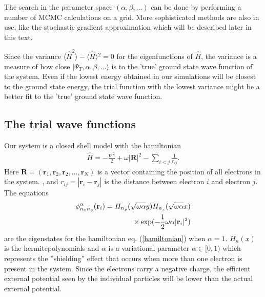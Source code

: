 \documentclass[a4paper,10pt,twocolumn]{article} %
\newcommand{\ts}[1]{\textbf{#1}}
\newcommand{\ket}[1]{|#1\rangle{}}
\newcommand{\expec}[1]{\langle{}{#1}\rangle{}}
\begin{document}
The search in the parameter space $(\alpha,\beta, \dots)$ can be done by performing a number of MCMC calculations on a grid. 
More sophisticated methods are also in use, like the stochastic gradient approximation which will be described later in this text.

Since the variance $\expec{\hat H^2}-\expec{\hat H}^2=0$ for the eigenfunctions of $\hat H$, the variance is a measure of how close 
$\ket{\Psi_T,\alpha,\beta,\dots}$ is to the 'true' ground state wave function of the system. Even if the lowest energy obtained in our simulations will be closest 
to the ground state energy, the trial function with the lowest variance might be a better fit to the 'true' ground state wave function. 

\subsection{The trial wave functions}%

Our system is a closed shell model with the hamiltonian 
\begin{align} 
	\hat H = -\frac{\nabla ^2}2 + \omega |\ts R|^2 - \sum_{i<j}\frac1{r_{ij}}.\label{hamiltonian}
\end{align}
Here $\ts R=(\ts r_1,\ts r_2, \ts r_2, \dots, \ts r_N)$ is a vector containing the position of all electrons in the system.
, and $r_{ij}=|\ts r_i-\ts r_j|$ is the distance between electron $i$ and electron $j$.
The equations
\begin{align}
	\phi_{n_xn_y}^\alpha(\ts r_i) = H_{n_y}(\sqrt{\omega\alpha}y)H_{n_x}(\sqrt{\omega\alpha}x)\notag\\
	\times \exp(-\frac12\omega\alpha|\ts r_i|^2) \label{1pts}
\end{align}
are the eigenstates for the hamiltonian eq. (\ref{hamiltonian}) when $\alpha=1$. $H_n(x)$ is the hermitepolynomials and $\alpha$ is a variational 
parameter $\alpha\in[0,1)$ which represents the ''shielding'' effect that occurs when more than one electron is present in the system. Since the 
electrons carry a negative charge, the efficient external potential seen by the individual particles will be lower than the actual external potential.
\end{document}
